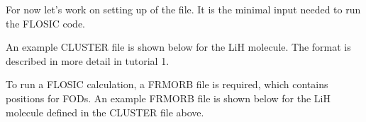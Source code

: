 \documentclass[letterpaper,10pt,english,openany,oneside]{sphinxmanual}
\begin{document}
\sphinxAtStartPar
For now let’s work on setting up of the  file. It is the minimal input needed to run the FLOSIC code.

\sphinxAtStartPar
An example CLUSTER file is shown below for the LiH molecule. The format is described in more detail in tutorial 1.

\begin{sphinxVerbatim}[commandchars=\\\{\}]
            
                             
                             
      
      
                       
          
\end{sphinxVerbatim}

\sphinxAtStartPar
To run a FLOSIC calculation, a FRMORB file is required, which contains positions for FODs. An example FRMORB file is shown below for the LiH molecule defined in the CLUSTER file above.

\begin{sphinxVerbatim}[commandchars=\\\{\}]
  
  
  
  
  
\end{sphinxVerbatim}
\end{document}
